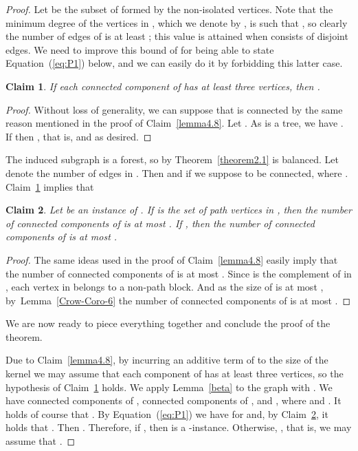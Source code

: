 \documentclass[
final
]{dmtcs-episciences}
\newtheorem{claimN}{Claim}{\bfseries}{\itshape}
\begin{document}
\begin{proof}
Let  be the subset of  formed by the non-isolated vertices. Note that the minimum degree of the vertices in , which we denote by , is such that , so clearly the number of edges of  is at least ; this value is attained when  consists of disjoint edges. We need to improve this bound of  for being able to state Equation~(\ref{eq:P1}) below, and we can easily do it by forbidding this latter case.



	\begin{claimN}\label{claim:2-3}
If each connected component of  has at least three vertices, then .
	\end{claimN}
	\begin{proof} Without loss of generality, we can suppose that  is connected by the same reason mentioned in the proof of Claim~\ref{lemma4.8}. Let . As  is a tree, we have . If  then , that is,  and  as desired. \end{proof}

The induced subgraph  is a forest, so by Theorem~\ref{theorem2.1}  is balanced. Let  denote the number of edges in . Then   and  if we suppose  to be connected, where . Claim~\ref{claim:2-3} implies that


\begin{claimN}\label{claim:number-comp}
Let  be an instance of {}. If  is the set of path vertices in , then the number of connected components of  is at most . If , then the number of connected components of  is  at most .
	\end{claimN}
\begin{proof}
 The same ideas used in the proof of Claim~\ref{lemma4.8} easily imply that the number of connected components of  is at most . Since  is the complement of  in , each vertex in  belongs to a non-path block. And as the size of  is at most , by~Lemma~\ref{Crow-Coro-6} the number of connected components of  is  at most . \end{proof}

We are now ready to piece everything together and conclude the proof of the theorem.

\vspace{.3cm}



 Due to Claim~\ref{lemma4.8}, by incurring an additive term of  to the size of the kernel we may assume that each component of  has at least three vertices, so the hypothesis of Claim~\ref{claim:2-3} holds. We apply Lemma~\ref{beta} to the graph  with . We have  connected components of ,  connected components of , and , where  and . It holds of course that . By Equation~(\ref{eq:P1}) we have  for  and, by Claim~\ref{claim:number-comp}, it holds that . Then . Therefore, if , then   is a {}-instance. Otherwise, , that is, we may assume that . 




\end{proof}
\end{document}
